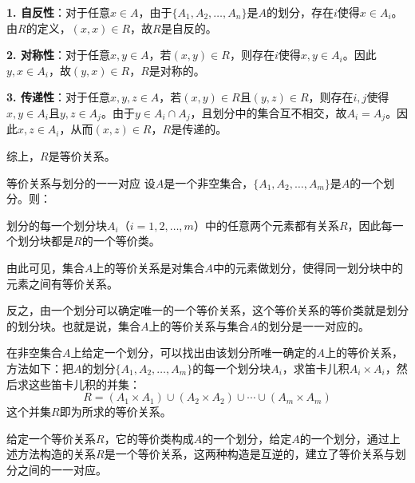 \textbf{1. 自反性}：对于任意$x \in A$，由于$\{A_1, A_2, \ldots, A_n\}$是$A$的划分，存在$i$使得$x \in A_i$。由$R$的定义，$(x, x) \in R$，故$R$是自反的。

\textbf{2. 对称性}：对于任意$x, y \in A$，若$(x, y) \in R$，则存在$i$使得$x, y \in A_i$。因此$y, x \in A_i$，故$(y, x) \in R$，$R$是对称的。

\textbf{3. 传递性}：对于任意$x, y, z \in A$，若$(x, y) \in R$且$(y, z) \in R$，则存在$i, j$使得$x, y \in A_i$且$y, z \in A_j$。由于$y \in A_i \cap A_j$，且划分中的集合互不相交，故$A_i = A_j$。因此$x, z \in A_i$，从而$(x, z) \in R$，$R$是传递的。

综上，$R$是等价关系。
\begin{theorem}{等价关系与划分的一一对应}{}
设$A$是一个非空集合，$\{A_1, A_2, \ldots, A_m\}$是$A$的一个划分。则：

划分的每一个划分块$A_i$（$i=1,2,\ldots,m$）中的任意两个元素都有关系$R$，因此每一个划分块都是$R$的一个等价类。
    
由此可见，集合$A$上的等价关系是对集合$A$中的元素做划分，使得同一划分块中的元素之间有等价关系。
    
反之，由一个划分可以确定唯一的一个等价关系，这个等价关系的等价类就是划分的划分块。也就是说，集合$A$上的等价关系与集合$A$的划分是一一对应的。
    
在非空集合$A$上给定一个划分，可以找出由该划分所唯一确定的$A$上的等价关系，方法如下：把$A$的划分$\{A_1, A_2, \ldots, A_m\}$的每一个划分块$A_i$，求笛卡儿积$A_i \times A_i$，然后求这些笛卡儿积的并集：
    \[
    R = (A_1 \times A_1) \cup (A_2 \times A_2) \cup \cdots \cup (A_m \times A_m)
    \]
这个并集$R$即为所求的等价关系。
\end{theorem}
给定一个等价关系$R$，它的等价类构成$A$的一个划分，给定$A$的一个划分，通过上述方法构造的关系$R$是一个等价关系，这两种构造是互逆的，建立了等价关系与划分之间的一一对应。


